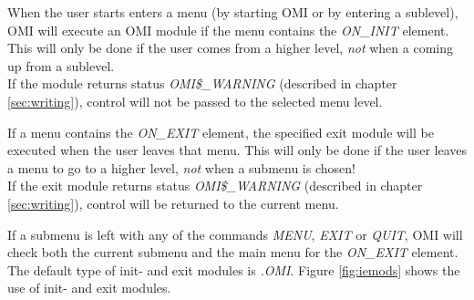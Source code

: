 \documentclass[a4paper]{book}
\newcommand{\vs}{\vspace{3mm}}
\begin{document}
When the user starts enters a menu (by starting OMI or by entering a 
sublevel), OMI will execute an OMI module if the menu contains the 
\textsl{ON{\_}INIT} element. This will only be done 
if the user comes from a higher level, \textit{not} when a coming up from a sublevel. \\
If the module returns status \textsl{OMI{\$}{\_}WARNING} (described in chapter \ref{sec:writing}), 
control will not be passed to the selected menu level.

\vs

If a menu contains the \textsl{ON{\_}EXIT} element, the 
specified exit module will be executed when the user leaves that menu. This 
will only be done if the user leaves a menu to go to a higher level, \textit{not} when a 
submenu is chosen! \\
If the exit module returns status \textsl{OMI{\$}{\_}WARNING} (described in chapter 
\ref{sec:writing}), control will be returned to the current menu.

\vs

If a submenu is left with any of the commands \textsl{MENU}, \textsl{EXIT} or \textsl{QUIT}, OMI will 
check both the current submenu and the main menu for the \textsl{ON{\_}EXIT} element. \\
The default type of init- and exit modules is \textsl{.OMI}. Figure \ref{fig:iemods}
shows the use of init- and exit modules.
\end{document}
